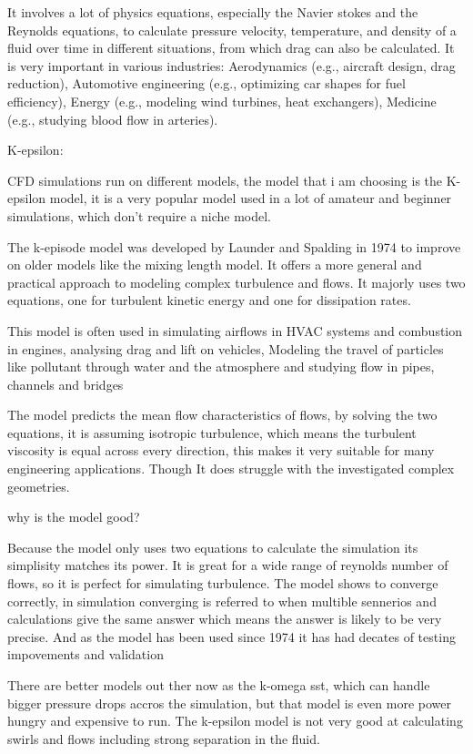 \documentclass[12pt,a4paper]{article}
\begin{document}
It involves a lot of physics equations, especially the Navier stokes and the Reynolds equations, to calculate pressure velocity, temperature, and density of a fluid over time in different situations, from which drag can also be calculated. It is very important in various industries: Aerodynamics (e.g., aircraft design, drag reduction), Automotive engineering (e.g., optimizing car shapes for fuel efficiency), Energy (e.g., modeling wind turbines, heat exchangers), Medicine (e.g., studying blood flow in arteries).

K-epsilon:

CFD simulations run on different models, the model that i am choosing is the K-epsilon model, it is a very popular model used in a lot of amateur and beginner simulations, which don't require a niche model.

The k-episode model was developed by Launder and Spalding in 1974 to improve on older models like the mixing length model. It offers a more general and practical approach to modeling complex turbulence and flows. It majorly uses two equations, one for turbulent kinetic energy and one for dissipation rates.

This model is often used in simulating airflows in HVAC systems and combustion in engines, analysing drag and lift on vehicles, Modeling the travel of particles like pollutant through water and the atmosphere and studying flow in pipes, channels and bridges

The model predicts the mean flow characteristics of flows, by solving the two equations, it is assuming isotropic turbulence, which means the turbulent viscosity is equal across every direction, this makes it very suitable for many engineering applications. Though It does struggle with the investigated complex geometries.

why is the model good?

Because the model only uses two equations to calculate the simulation its simplisity matches its power. It is great for a wide range of reynolds number of flows, so it is perfect for simulating turbulence. The model shows to converge correctly, in simulation converging is referred to when multible sennerios and calculations give the same answer which means the answer is likely to be very precise. And as the model has been used since 1974 it has had decates of testing impovements and validation

There are better models out ther now as the k-omega sst, which can handle bigger pressure drops accros the simulation, but that model is even more power hungry and expensive to run. The k-epsilon model is not very good at calculating swirls and flows including strong separation in the fluid.
\end{document}
